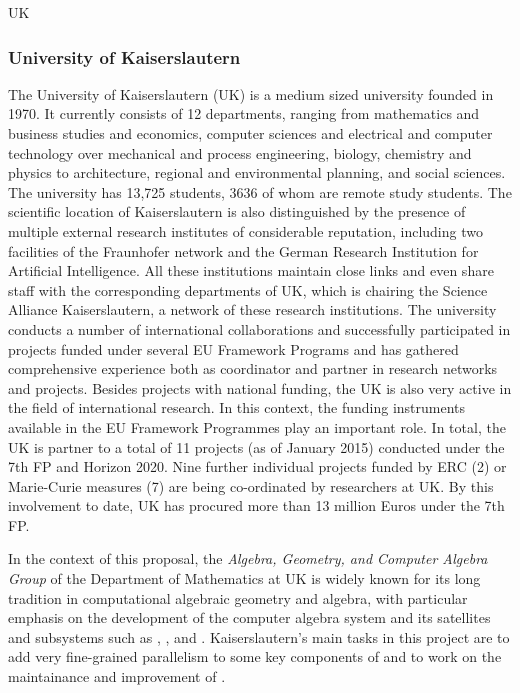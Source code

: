 \begin{sitedescription}{UK}
\subsubsection{University of Kaiserslautern}

The University of Kaiserslautern (UK) is a medium sized university founded in 1970. It currently 
consists of 12 departments, ranging from mathematics and business studies and economics, 
computer sciences and electrical and computer technology over mechanical and process engineering, 
biology, chemistry and physics to architecture, regional and environmental planning, and social sciences. 
The university has 13,725 students, 3636 of whom are remote study students. The scientific location 
of Kaiserslautern is also distinguished by the presence of multiple external research institutes of 
considerable reputation, including two facilities of the Fraunhofer network and the German Research 
Institution for Artificial Intelligence. All these institutions maintain close links and even share staff 
with the corresponding departments of UK, which is chairing the Science Alliance Kaiserslautern, 
a network of these research institutions. The university conducts a number of international 
collaborations and successfully participated in projects funded under several EU Framework 
Programs and has gathered comprehensive experience both as coordinator and partner in research 
networks and projects. Besides projects with national funding, the UK is 
also very active in the field of international research. In this context, the funding instruments 
available in the EU Framework Programmes play an important role. In total, the UK is partner 
to a total of 11 projects (as of January 2015) conducted under the 7th FP and Horizon 2020. 
Nine further individual projects funded by ERC (2) or Marie-Curie measures (7) are being co-ordinated 
by researchers at UK. By this involvement to date, UK has procured more than 13 million Euros under the 7th FP.

\medskip In the context of this proposal, the
\emph{Algebra, Geometry, and Computer Algebra Group}  of the Department
of Mathematics at UK is widely known for its long tradition in 
computational algebraic geometry and algebra, with particular emphasis on the 
development of the computer algebra system \Singular and its satellites and  
subsystems such as {}, {}, and {}.
Kaiserslautern's main tasks in this project are to add very fine-grained 
parallelism to some key components of {} and to work
on the maintainance and improvement of \MPIR.


\end{sitedescription}
